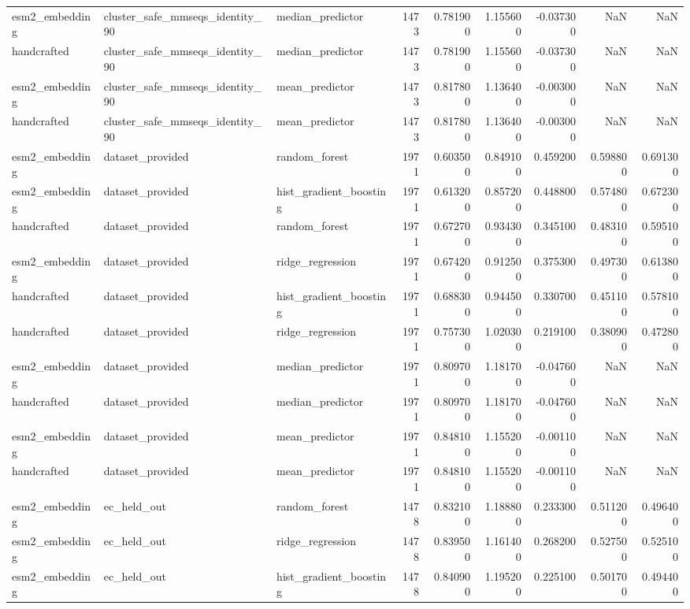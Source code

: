 \begin{longtable}{lllrrrrrr}
esm2\_embedding & cluster\_safe\_mmseqs\_identity\_90 & median\_predictor & 1473 & 0.781900 & 1.155600 & -0.037300 & NaN & NaN \\
handcrafted & cluster\_safe\_mmseqs\_identity\_90 & median\_predictor & 1473 & 0.781900 & 1.155600 & -0.037300 & NaN & NaN \\
esm2\_embedding & cluster\_safe\_mmseqs\_identity\_90 & mean\_predictor & 1473 & 0.817800 & 1.136400 & -0.003000 & NaN & NaN \\
handcrafted & cluster\_safe\_mmseqs\_identity\_90 & mean\_predictor & 1473 & 0.817800 & 1.136400 & -0.003000 & NaN & NaN \\
esm2\_embedding & dataset\_provided & random\_forest & 1971 & 0.603500 & 0.849100 & 0.459200 & 0.598800 & 0.691300 \\
esm2\_embedding & dataset\_provided & hist\_gradient\_boosting & 1971 & 0.613200 & 0.857200 & 0.448800 & 0.574800 & 0.672300 \\
handcrafted & dataset\_provided & random\_forest & 1971 & 0.672700 & 0.934300 & 0.345100 & 0.483100 & 0.595100 \\
esm2\_embedding & dataset\_provided & ridge\_regression & 1971 & 0.674200 & 0.912500 & 0.375300 & 0.497300 & 0.613800 \\
handcrafted & dataset\_provided & hist\_gradient\_boosting & 1971 & 0.688300 & 0.944500 & 0.330700 & 0.451100 & 0.578100 \\
handcrafted & dataset\_provided & ridge\_regression & 1971 & 0.757300 & 1.020300 & 0.219100 & 0.380900 & 0.472800 \\
esm2\_embedding & dataset\_provided & median\_predictor & 1971 & 0.809700 & 1.181700 & -0.047600 & NaN & NaN \\
handcrafted & dataset\_provided & median\_predictor & 1971 & 0.809700 & 1.181700 & -0.047600 & NaN & NaN \\
esm2\_embedding & dataset\_provided & mean\_predictor & 1971 & 0.848100 & 1.155200 & -0.001100 & NaN & NaN \\
handcrafted & dataset\_provided & mean\_predictor & 1971 & 0.848100 & 1.155200 & -0.001100 & NaN & NaN \\
esm2\_embedding & ec\_held\_out & random\_forest & 1478 & 0.832100 & 1.188800 & 0.233300 & 0.511200 & 0.496400 \\
esm2\_embedding & ec\_held\_out & ridge\_regression & 1478 & 0.839500 & 1.161400 & 0.268200 & 0.527500 & 0.525100 \\
esm2\_embedding & ec\_held\_out & hist\_gradient\_boosting & 1478 & 0.840900 & 1.195200 & 0.225100 & 0.501700 & 0.494400 \\

\end{longtable}
